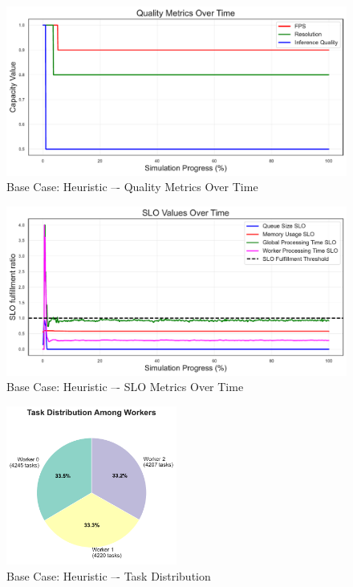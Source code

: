 \begin{figure}[h]
    \centering
    \includegraphics[width=\textwidth]{img/results/basic/heuristic_quality_metrics.pdf}
    \caption{Base Case: Heuristic –- Quality Metrics Over Time}
\end{figure}
\begin{figure}[h]
    \centering
    \includegraphics[width=\textwidth]{img/results/basic/heuristic_slo_values.pdf}
    \caption{Base Case: Heuristic –- SLO Metrics Over Time}
\end{figure}
\begin{figure}[h]
    \centering
    \includegraphics[width=0.5\textwidth]{img/results/basic/heuristic_task_distribution_pie.pdf}
    \caption{Base Case: Heuristic –- Task Distribution}
\end{figure}

